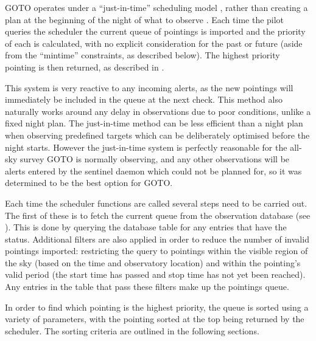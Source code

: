 \begin{colsection}

GOTO operates under a ``just-in-time'' scheduling model \citep[see, for example,][]{LCO_scheduling}, rather than creating a plan at the beginning of the night of what to observe \citep[see, for example,][]{ZTF_scheduler}. Each time the pilot queries the scheduler the current queue of pointings is imported and the priority of each is calculated, with no explicit consideration for the past or future (aside from the ``mintime'' constraints, as described below). The highest priority pointing is then returned, as described in .

This system is very reactive to any incoming alerts, as the new pointings will immediately be included in the queue at the next check. This method also naturally works around any delay in observations due to poor conditions, unlike a fixed night plan. The just-in-time method can be less efficient than a night plan when observing predefined targets which can be deliberately optimised before the night starts. However the just-in-time system is perfectly reasonable for the all-sky survey GOTO is normally observing, and any other observations will be alerts entered by the sentinel daemon which could not be planned for, so it was determined to be the best option for GOTO.\@

Each time the scheduler functions are called several steps need to be carried out. The first of these is to fetch the current queue from the observation database (see ). This is done by querying the database  table for any entries that have the  status. Additional filters are also applied in order to reduce the number of invalid pointings imported: restricting the query to pointings within the visible region of the sky (based on the time and observatory location) and within the pointing's valid period (the start time has passed and stop time has not yet been reached). Any entries in the table that pass these filters make up the pointings queue.

In order to find which pointing is the highest priority, the queue is sorted using a variety of parameters, with the pointing sorted at the top being returned by the scheduler. The sorting criteria are outlined in the following sections.

\end{colsection}


